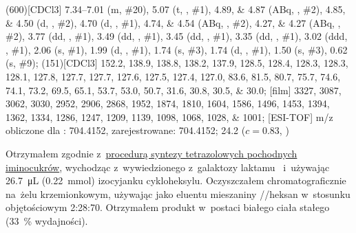 \begin{fullexp}
  \NMR(600)[CDCl3] \numrange{7.34}{7.01} (m, \#{20}), \num{5.07} (t, , \#{1}), \numlist{4.89;4.87} (ABq, , \#{2}), \numlist{4.85;4.50} (d, , \#{2}), \num{4.70} (d, , \#{1}), \numlist{4.74;4.54} (ABq, , \#{2}), \numlist{4.27;4.27} (ABq, , \#{2}), \num{3.77} (dd, , \#{1}), \num{3.49} (dd, , \#{1}), \num{3.45} (dd, , \#{1}), \num{3.35} (dd, , \#{1}), \num{3.02} (ddd, , \#{1}), \num{2.06} (s, \#{1}), \num{1.99} (d, , \#{1}), \num{1.74} (s, \#{3}), \num{1.74} (d, , \#{1}), \num{1.50} (s, \#{3}), \num{0.62} (s, \#{9});
  (151)[CDCl3] \numlist{152.2; 138.9; 138.8; 138.2; 137.9; 128.5; 128.4; 128.3; 128.3; 128.1; 127.8; 127.7; 127.7; 127.6; 127.5; 127.4; 127.0; 83.6; 81.5; 80.7; 75.7; 74.6; 74.1; 73.2; 69.5; 65.1; 53.7; 53.0; 50.7; 31.6; 30.8; 30.5; 30.0};
  [film] \numlist{3327; 3087; 3062; 3030; 2952; 2906; 2868; 1952; 1874; 1810; 1604; 1586; 1496; 1453; 1394; 1362; 1334; 1286; 1247; 1209; 1139; 1098; 1068; 1028; 1001};
  [ESI-TOF] m/z obliczone dla : \num{704.4152}, zarejestrowane: \num{704.4152};
  \data{[$\alpha^{23}_D$]~$=$} \num{24.2} ($c = 0.83$, )
\end{fullexp}

Otrzymałem zgodnie z~\hyperref[experimental:sugars:schwartz]{procedurą syntezy tetrazolowych
  pochodnych iminocukrów}, wychodząc z~wywiedzionego z~galaktozy laktamu~
  i~używając \SI{26.7}{\micro\liter} (\SI{0.22}{\milli\mol}) izocyjanku cykloheksylu.
Oczyszczałem chromatograficznie na~żelu krzemionkowym,
  używając jako eluentu mieszaniny //heksan w~stosunku objętościowym
  \num{2}:\num{28}:\num{70}.
Otrzymałem produkt w~postaci białego ciała stałego (\SI{33}{\percent} wydajności).

